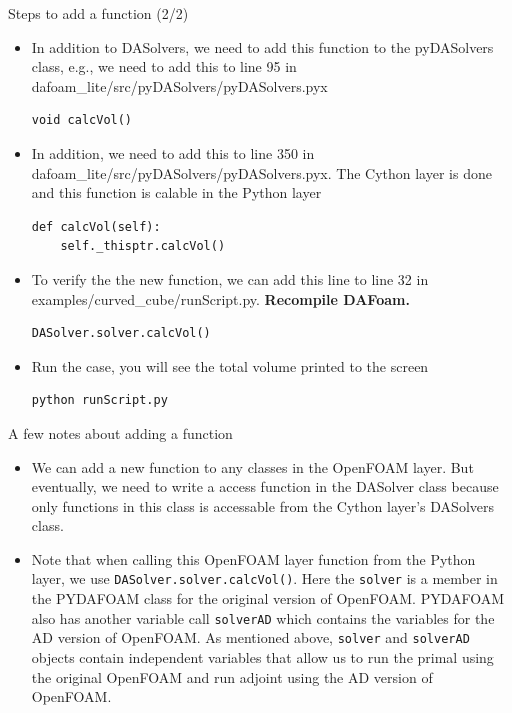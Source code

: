 \documentclass{bredelebeamer}
\begin{document}
\begin{frame}[fragile]{Steps to add a function (2/2)}
\begin{itemize}
  \setlength\itemsep{0.5em}
 \item In addition to DASolvers, we need to add this function to the pyDASolvers class, e.g., we need to add this to line 95 in dafoam\_lite/src/pyDASolvers/pyDASolvers.pyx
 \footnotesize
 \lstset{ language=c++ }
 \begin{lstlisting}
void calcVol()
 \end{lstlisting}
 \normalsize
 \item In addition, we need to add this to line 350 in dafoam\_lite/src/pyDASolvers/pyDASolvers.pyx. The Cython layer is done and this function is calable in the Python layer
 \footnotesize
 \lstset{ language=c++ }
 \begin{lstlisting}
def calcVol(self):
    self._thisptr.calcVol()
 \end{lstlisting}
 \normalsize
 \item To verify the the new function, we can add this line to line 32 in examples/curved\_cube/runScript.py. \textbf{Recompile DAFoam.}
 \footnotesize
 \lstset{ language=c++ }
 \begin{lstlisting}
DASolver.solver.calcVol()
 \end{lstlisting}
 \normalsize
 \item Run the case, you will see the total volume printed to the screen
 \footnotesize
 \lstset{ language=bash}
 \begin{lstlisting}
python runScript.py
 \end{lstlisting}
 \normalsize
\end{itemize}
\end{frame}

\begin{frame}[fragile]{A few notes about adding a function}
\begin{itemize}
  \setlength\itemsep{0.5em}
 \item We can add a new function to any classes in the OpenFOAM layer. But eventually, we need to write a access function in the DASolver class because only functions in this class is accessable from the Cython layer's DASolvers class.
 \item Note that when calling this OpenFOAM layer function from the Python layer, we use \texttt{DASolver.solver.calcVol()}. Here the \texttt{solver} is a member in the PYDAFOAM class for the original version of OpenFOAM. PYDAFOAM also has another variable call \texttt{solverAD} which contains the variables for the AD version of OpenFOAM. As mentioned above, \texttt{solver} and \texttt{solverAD} objects contain independent variables that allow us to run the primal using the original OpenFOAM and run adjoint using the AD version of OpenFOAM. 
\end{itemize}
\end{frame}
\end{document}
